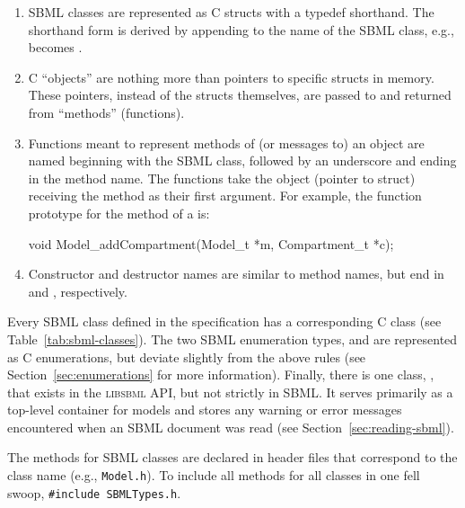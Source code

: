 \documentclass{cekmanual}
\begin{document}
\begin{enumerate}

  \item SBML classes are represented as C structs with a typedef
  shorthand.  The shorthand form is derived by appending 
  to the name of the SBML class, e.g.,  becomes
  .

  \item C ``objects'' are nothing more than pointers to specific
  structs in memory.  These pointers, instead of the structs
  themselves, are passed to and returned from ``methods'' (functions).

  \item Functions meant to represent methods of (or messages to) an
  object are named beginning with the SBML class, followed by an
  underscore and ending in the method name.  The functions take the
  object (pointer to struct) receiving the method as their first
  argument.  For example, the function prototype for the
   method of a  is:

    \begin{example}[c]
    void Model_addCompartment(Model_t *m, Compartment_t *c);
    \end{example}

  \item Constructor and destructor names are similar to method names,
  but end in  and , respectively.

\end{enumerate}


Every SBML class defined in the specification has a corresponding C
class (see Table~\ref{tab:sbml-classes}).  The two SBML enumeration
types,  and  are represented as C
enumerations, but deviate slightly from the above rules (see
Section~\ref{sec:enumerations} for more information).  Finally, there
is one class, , that exists in the
\textsc{libsbml} API, but not strictly in SBML.  It serves primarily
as a top-level container for models and stores any warning or error
messages encountered when an SBML document was read (see
Section~\ref{sec:reading-sbml}).

The methods for SBML classes are declared in header files that
correspond to the class name (e.g., \texttt{Model.h}).  To include all
methods for all classes in one fell swoop, \texttt{\#include
SBMLTypes.h}.
\end{document}
